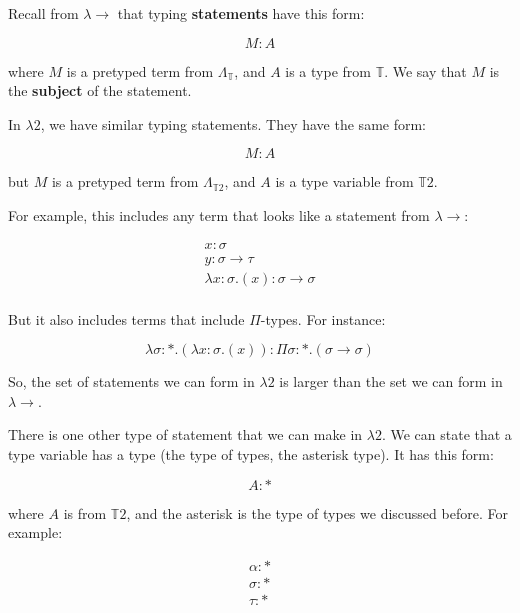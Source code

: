 \documentclass{book}
\numberwithin{equation}{chapter}
\newcommand{\vocab}{\textbf}
\begin{document}
Recall from $\lambda \rightarrow$ that typing \vocab{statements} have this form:

\begin{equation}
M : A
\end{equation}

\noindent
where $M$ is a pretyped term from $\Lambda_{\mathbb{T}}$, and $A$ is a type from $\mathbb{T}$. We say that $M$ is the \vocab{subject} of the statement.

In $\lambda2$, we have similar typing statements. They have the same form:

\begin{equation}
M : A
\end{equation}

\noindent
but $M$ is a pretyped term from $\Lambda_{\mathbb{T}2}$, and $A$ is a type variable from $\mathbb{T}2$.

For example, this includes any term that looks like a statement from $\lambda \rightarrow$:

\begin{align}
x : \sigma \\
y : \sigma \rightarrow \tau \\
\lambda x: \sigma.(x) : \sigma \rightarrow \sigma \\
\end{align}

\noindent
But it also includes terms that include $\Pi$-types. For instance:

\begin{equation}
\lambda \sigma : *.(\lambda x: \sigma.(x)) : \Pi \sigma : *.(\sigma \rightarrow \sigma)
\end{equation}

\noindent
So, the set of statements we can form in $\lambda 2$ is larger than the set we can form in $\lambda \rightarrow$.

There is one other type of statement that we can make in $\lambda 2$. We can state that a type variable has a type (the type of types, the asterisk type). It has this form:

\begin{equation}
A : *
\end{equation}

\noindent
where $A$ is from $\mathbb{T}2$, and the asterisk is the type of types we discussed before. For example:

\begin{align}
\alpha : * \\
\sigma : * \\
\tau : *
\end{align}
\end{document}
